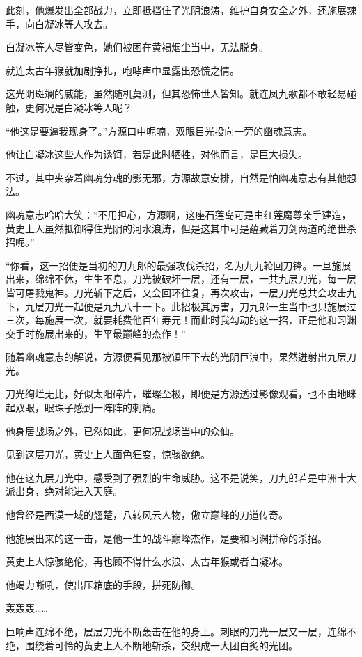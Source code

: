 \begin{this_body}
此刻，他爆发出全部战力，立即抵挡住了光阴浪涛，维护自身安全之外，还施展辣手，向白凝冰等人攻去。

白凝冰等人尽皆变色，她们被困在黄褐烟尘当中，无法脱身。

就连太古年猴就加剧挣扎，咆哮声中显露出恐慌之情。

这光阴斑斓的威能，虽然随机莫测，但其恐怖世人皆知。就连凤九歌都不敢轻易碰触，更何况是白凝冰等人呢？

“他这是要逼我现身了。”方源口中呢喃，双眼目光投向一旁的幽魂意志。

他让白凝冰这些人作为诱饵，若是此时牺牲，对他而言，是巨大损失。

不过，其中夹杂着幽魂分魂的影无邪，方源故意安排，自然是怕幽魂意志有其他想法。

幽魂意志哈哈大笑：“不用担心，方源啊，这座石莲岛可是由红莲魔尊亲手建造，黄史上人虽然抵御得住光阴的河水浪涛，但是这其中可是蕴藏着刀剑两道的绝世杀招呢。”

“你看，这一招便是当初的刀九郎的最强攻伐杀招，名为九九轮回刀锋。一旦施展出来，绵绵不休，生生不息，刀光被破坏一层，还有一层，一共九层刀光，每一层皆可屠戮鬼神。刀光斩下之后，又会回环往复，再次攻击，一层刀光总共会攻击九下，九层刀光一起便是九九八十一下。此招极其厉害，刀九郎一生当中也只施展过三次，每施展一次，就要耗费他百年寿元！而此时我勾动的这一招，正是他和习渊交手时施展出来的，生平最巅峰的杰作！”

随着幽魂意志的解说，方源便看见那被镇压下去的光阴巨浪中，果然迸射出九层刀光。

刀光绚烂无比，好似太阳碎片，璀璨至极，即便是方源透过影像观看，也不由地眯起双眼，眼珠子感到一阵阵的刺痛。

他身居战场之外，已然如此，更何况战场当中的众仙。

见到这层刀光，黄史上人面色狂变，惊骇欲绝。

他在这九层刀光中，感受到了强烈的生命威胁。这不是说笑，刀九郎若是中洲十大派出身，绝对能进入天庭。

他曾经是西漠一域的翘楚，八转风云人物，傲立巅峰的刀道传奇。

他施展出来的这一击，是他一生的战斗巅峰杰作，是要和习渊拼命的杀招。

黄史上人惊骇绝伦，再也顾不得什么水浪、太古年猴或者白凝冰。

他竭力嘶吼，使出压箱底的手段，拼死防御。

轰轰轰……

巨响声连绵不绝，层层刀光不断轰击在他的身上。刺眼的刀光一层又一层，连绵不绝，围绕着可怜的黄史上人不断地斩杀，交织成一大团白炙的光团。


\end{this_body}

